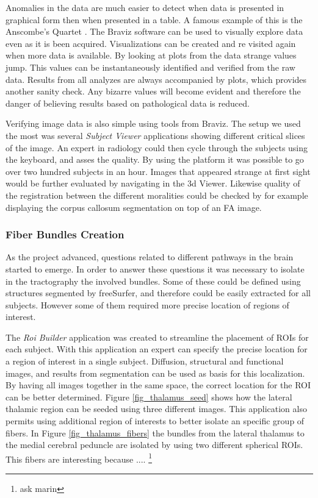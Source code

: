 Anomalies in the data are much easier to detect when data is presented in graphical form then when presented in a table. A famous example of this is the Anscombe's Quartet \autocite{anscombe_graphs_1973}. The Braviz software can be used to visually explore data even as it is been acquired. Visualizations can be created and re visited again when more data is available. By looking at plots from the data strange values jump. This values can be instantaneously identified and verified from the raw data. Results from all analyzes are always accompanied by plots, which provides another sanity check. Any bizarre values will become evident and therefore the danger of believing results based on pathological data is reduced.

Verifying image data is also simple using tools from Braviz. The setup we used the most was several \emph{Subject Viewer} applications showing different critical slices of the image. An expert in radiology could then cycle through the subjects using the keyboard, and asses the quality. By using the platform it was possible to go over two hundred subjects in an hour. Images that appeared strange at first sight would be further evaluated by navigating in the 3d Viewer. Likewise quality of the registration between the different moralities could be checked by for example displaying the corpus callosum segmentation on top of an FA image. 

\subsubsection{Fiber Bundles Creation}

As the project advanced, questions related to different pathways in the brain started to emerge. In order to answer these questions it was necessary to isolate in the tractography the involved bundles. Some of these could be defined using structures segmented by freeSurfer, and therefore could be easily extracted for all subjects. However some of them required more precise location of regions of interest. 

The \emph{Roi Builder} application was created to streamline the placement of ROIs for each subject. With this application an expert can specify the precise location for a region of interest in a single subject. Diffusion, structural and functional images, and results from segmentation can be used as basis for this localization. By having all images together in the same space, the correct location for the ROI can be better determined. Figure \ref{fig_thalamus_seed} shows how the lateral thalamic region can be seeded using three different images.  This application also permits using additional region of interests to better isolate an specific group of fibers. In Figure \ref{fig_thalamus_fibers} the bundles from the lateral thalamus to the medial cerebral peduncle are isolated by using two different spherical ROIs. This fibers are interesting because .... \footnote{ask marin}

